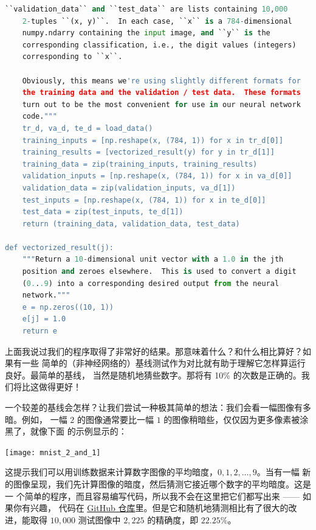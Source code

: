 \begin{lstlisting}[language=Python]
    ``validation_data`` and ``test_data`` are lists containing 10,000
    2-tuples ``(x, y)``.  In each case, ``x`` is a 784-dimensional
    numpy.ndarry containing the input image, and ``y`` is the
    corresponding classification, i.e., the digit values (integers)
    corresponding to ``x``.

    Obviously, this means we're using slightly different formats for
    the training data and the validation / test data.  These formats
    turn out to be the most convenient for use in our neural network
    code."""
    tr_d, va_d, te_d = load_data()
    training_inputs = [np.reshape(x, (784, 1)) for x in tr_d[0]]
    training_results = [vectorized_result(y) for y in tr_d[1]]
    training_data = zip(training_inputs, training_results)
    validation_inputs = [np.reshape(x, (784, 1)) for x in va_d[0]]
    validation_data = zip(validation_inputs, va_d[1])
    test_inputs = [np.reshape(x, (784, 1)) for x in te_d[0]]
    test_data = zip(test_inputs, te_d[1])
    return (training_data, validation_data, test_data)

def vectorized_result(j):
    """Return a 10-dimensional unit vector with a 1.0 in the jth
    position and zeroes elsewhere.  This is used to convert a digit
    (0...9) into a corresponding desired output from the neural
    network."""
    e = np.zeros((10, 1))
    e[j] = 1.0
    return e
\end{lstlisting}

上面我说过我们的程序取得了非常好的结果。那意味着什么？和什么相比算好？如果有一些
简单的（非神经网络的）基线测试作为对比就有助于理解它怎样算运行良好。最简单的基线，
当然是随机地猜些数字。那将有 10\% 的次数是正确的。我们将比这做得更好！

一个较差的基线会怎样？让我们尝试一种极其简单的想法：我们会看一幅图像有多暗。例如，
一幅 $2$ 的图像通常要比一幅 $1$ 的图像稍暗些，仅仅因为更多像素被涂黑了，就像下面
的示例显示的：
\begin{center}
  \texttt{[image: mnist\_2\_and\_1]}
\end{center}

这提示我们可以用训练数据来计算数字图像的平均暗度，$0, 1, 2,\ldots, 9$。当有一幅
新的图像呈现，我们先计算图像的暗度，然后猜测它接近哪个数字的平均暗度。这是一
个简单的程序，而且容易编写代码，所以我不会在这里把它们都写出来 —— 如果你有兴趣，
代码在
\href{https://github.com/mnielsen/neural-networks-and-deep-learning/blob/master/src/mnist_average_darkness.py}{GitHub
  仓库}里。但是它和随机地猜测相比有了很大的改进，能取得 $10,000$ 测试图像中
$2,225$ 的精确度，即 $22.25\%$。

